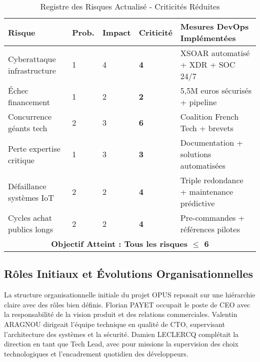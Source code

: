 \documentclass[12pt,a4paper]{article}
\begin{document}
\begin{table}[H]
\centering
\caption{Registre des Risques Actualisé - Criticités Réduites}
\begin{tabular}{|p{2.8cm}|p{1.2cm}|p{1.2cm}|p{1.2cm}|p{4.5cm}|}
\hline
\textbf{Risque} & \textbf{Prob.} & \textbf{Impact} & \textbf{Criticité} & \textbf{Mesures DevOps Implémentées} \\
\hline
\rowcolor{green!10}
Cyberattaque infrastructure & 1 & 4 & \textbf{4} & XSOAR automatisé + XDR + SOC 24/7 \\
\hline
\rowcolor{green!10}
Échec financement & 1 & 2 & \textbf{2} & 5,5M euros sécurisés + pipeline \\
\hline
\rowcolor{yellow!10}
Concurrence géants tech & 2 & 3 & \textbf{6} & Coalition French Tech + brevets \\
\hline
\rowcolor{yellow!10}
Perte expertise critique & 1 & 3 & \textbf{3} & Documentation + solutions automatisées \\
\hline
\rowcolor{green!10}
Défaillance systèmes IoT & 2 & 2 & \textbf{4} & Triple redondance + maintenance prédictive \\
\hline
\rowcolor{green!10}
Cycles achat publics longs & 2 & 2 & \textbf{4} & Pre-commandes + références pilotes \\
\hline
\multicolumn{5}{|c|}{\textbf{Objectif Atteint : Tous les risques $\leq$ 6}} \\
\hline
\end{tabular}
\end{table}

\subsection{Rôles Initiaux et Évolutions Organisationnelles}

La structure organisationnelle initiale du projet OPUS reposait sur une hiérarchie claire avec des rôles bien définis. Florian PAYET occupait le poste de CEO avec la responsabilité de la vision produit et des relations commerciales. Valentin ARAGNOU dirigeait l'équipe technique en qualité de CTO, supervisant l'architecture des systèmes et la sécurité. Damien LECLERCQ complétait la direction en tant que Tech Lead, avec pour missions la supervision des choix technologiques et l'encadrement quotidien des développeurs.
\end{document}
